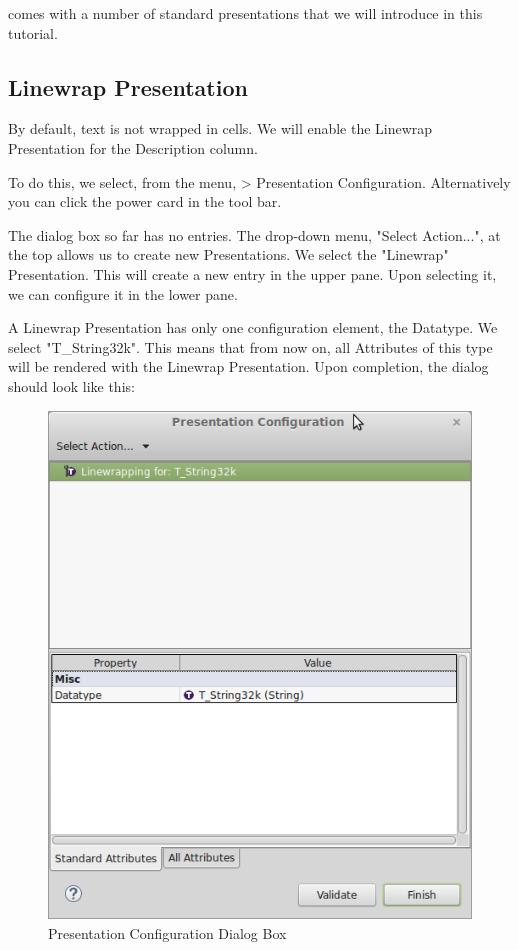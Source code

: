 \pror{} comes with a number of standard presentations that we will introduce in this tutorial.

\subsection{Linewrap Presentation}

By default, text is not wrapped in cells.  We will enable the Linewrap Presentation for the Description column.

To do this, we select, from the menu,  \pror{} \textgreater{} Presentation Configuration.  Alternatively you can click the power card in the tool bar.

The dialog box so far has no entries.  The drop-down menu, "Select Action...", at the top allows us to create new Presentations.  We select the "Linewrap" Presentation.  This will create a new entry in the upper pane.  Upon selecting it, we can configure it in the lower pane.

A Linewrap Presentation has only one configuration element, the Datatype.  We select "T\_String32k".  This means that from now on, all Attributes of this type will be rendered with the Linewrap Presentation.  Upon completion, the dialog should look like this:

\begin{figure}[h!]
\centering
\includegraphics[width=0.8\linewidth]{../rmf-images/presentationconfig.png}      
\caption{Presentation Configuration Dialog Box}      
\label{fig:presentationConfig}
\end{figure}

